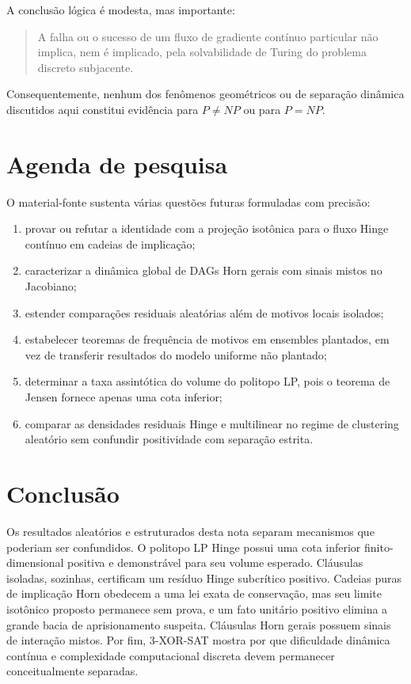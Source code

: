 \documentclass[11pt,a4paper]{article}
\begin{document}
A conclusão lógica é modesta, mas importante:
\begin{quote}
A falha ou o sucesso de um fluxo de gradiente contínuo particular não implica, nem é implicado, pela solvabilidade de Turing do problema discreto subjacente.
\end{quote}
Consequentemente, nenhum dos fenômenos geométricos ou de separação dinâmica discutidos aqui constitui evidência para $P\ne NP$ ou para $P=NP$.

\section{Agenda de pesquisa}
O material-fonte sustenta várias questões futuras formuladas com precisão:
\begin{enumerate}
\item provar ou refutar a identidade com a projeção isotônica para o fluxo Hinge contínuo em cadeias de implicação;
\item caracterizar a dinâmica global de DAGs Horn gerais com sinais mistos no Jacobiano;
\item estender comparações residuais aleatórias além de motivos locais isolados;
\item estabelecer teoremas de frequência de motivos em ensembles plantados, em vez de transferir resultados do modelo uniforme não plantado;
\item determinar a taxa assintótica do volume do politopo LP, pois o teorema de Jensen fornece apenas uma cota inferior;
\item comparar as densidades residuais Hinge e multilinear no regime de clustering aleatório sem confundir positividade com separação estrita.
\end{enumerate}

\section{Conclusão}
Os resultados aleatórios e estruturados desta nota separam mecanismos que poderiam ser confundidos. O politopo LP Hinge possui uma cota inferior finito-dimensional positiva e demonstrável para seu volume esperado. Cláusulas isoladas, sozinhas, certificam um resíduo Hinge subcrítico positivo. Cadeias puras de implicação Horn obedecem a uma lei exata de conservação, mas seu limite isotônico proposto permanece sem prova, e um fato unitário positivo elimina a grande bacia de aprisionamento suspeita. Cláusulas Horn gerais possuem sinais de interação mistos. Por fim, 3-XOR-SAT mostra por que dificuldade dinâmica contínua e complexidade computacional discreta devem permanecer conceitualmente separadas.
\end{document}
